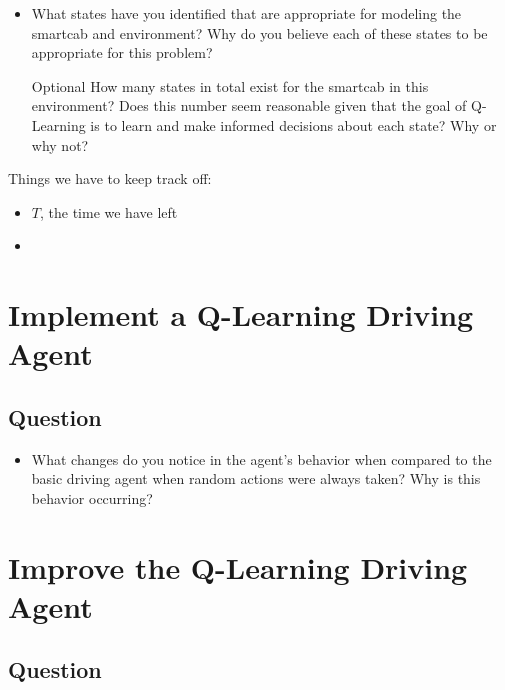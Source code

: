 \documentclass[twoside,openright,titlepage,numbers=noenddot,headinclude,%
               footinclude=true,cleardoublepage=empty,abstractoff,BCOR=5mm,%
               paper=a4,fontsize=11pt,ngerman,american]{scrreprt}
\numberwithin{theorem}{chapter}
\numberwithin{definition}{chapter}
\numberwithin{algorithm}{chapter}
\numberwithin{figure}{chapter}
\numberwithin{table}{chapter}
\numberwithin{equation}{chapter}
\begin{document}
\begin{itemize}
\item What states have you identified that are appropriate for modeling the smartcab and environment? Why do you believe each of these states to be appropriate for this problem?

\item [Optional] How many states in total exist for the smartcab in this environment? Does this number seem reasonable given that the goal of Q-Learning is to learn and make informed decisions about each state? Why or why not?
\end{itemize}




Things we have to keep track off:
\begin{itemize}
\item $T$, the time we have left
\item
\end{itemize}


%
%

\chapter*{Implement a Q-Learning Driving Agent}

\section*{Question}

\begin{itemize}
\item What changes do you notice in the agent's behavior when compared to the basic driving agent when random actions were always taken? Why is this behavior occurring?

\end{itemize}


%
%

\chapter*{Improve the Q-Learning Driving Agent}

\section*{Question}
\end{document}
